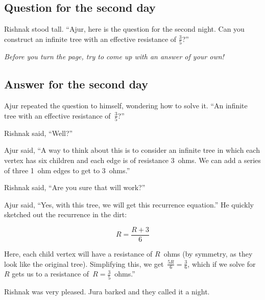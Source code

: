 \subsection*{Question for the second day}
Rishnak stood tall. ``Ajur, here is the question for the second night. Can you construct an infinite tree with an effective resistance of $\frac{3}{5}$?''

\textit{Before you turn the page, try to come up with an answer of your own!}

\newpage
\subsection*{Answer for the second day}
Ajur repeated the question to himself, wondering how to solve it. ``An infinite tree with an effective resistance of~$\frac{3}{5}$?''

Rishnak said, ``Well?''

Ajur said, ``A way to think about this is to consider an infinite tree in which each vertex has six children and each edge is of resistance 3~ohms. We can add a series of three 1~ohm edges to get to 3~ohms.''

Rishnak said, ``Are you sure that will work?''

Ajur said, ``Yes, with this tree, we will get this recurrence equation.''  He quickly sketched out the recurrence in the dirt:

$$R=\frac{R+3}{6}$$

\noindent Here, each child vertex will have a resistance of $R$~ohms (by symmetry, as they look like the original tree). Simplifying this, we get~$\frac{5R}{6}=\frac{3}{6}$, which if we solve for~$R$ gets us to a resistance of~$R=\frac{3}{5}$~ohms.''

Rishnak was very pleased. Jura barked and they called it a night.